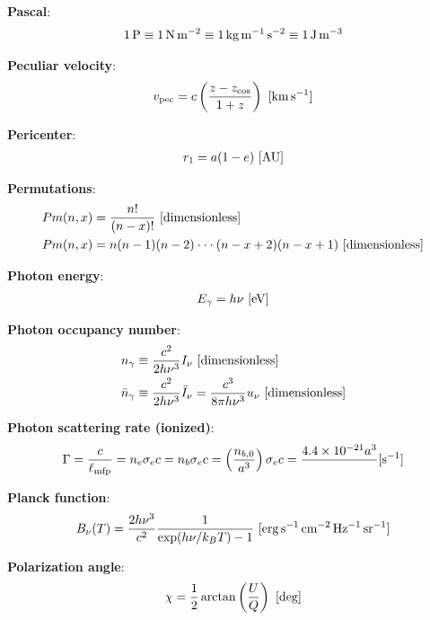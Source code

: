 \documentclass[a4paper,10pt]{article}
\begin{document}
{\noindent}\textbf{Pascal}:
\begin{align*}
    {\rm 1\,P \equiv 1\,N\,m^{-2} \equiv 1\,kg\,m^{-1}\,s^{-2} \equiv 1\,J\,m^{-3}}
\end{align*}

{\noindent}\textbf{Peculiar velocity}:
\begin{align*}
    v_{\rm pec} = c\left(\frac{z-z_\mathrm{cos}}{1+z}\right) ~ [{\rm km\,s^{-1}}]
\end{align*}

{\noindent}\textbf{Pericenter}:
\begin{align*}
    r_1 = a(1-e) ~ [{\rm AU}]
\end{align*}

{\noindent}\textbf{Permutations}:
\begin{align*}
    Pm(n,x) &= \frac{n!}{(n-x)!} ~ [{\rm dimensionless}] \\
    Pm(n,x) &= n(n-1)(n-2) \cdot\cdot\cdot (n-x+2)(n-x+1) ~ [{\rm dimensionless}]
\end{align*}

{\noindent}\textbf{Photon energy}:
\begin{align*}
    E_\gamma = h\nu ~ [{\rm eV}]
\end{align*}

{\noindent}\textbf{Photon occupancy number}:
\begin{align*}
    n_\gamma &\equiv \frac{c^2}{2h\nu^3} I_\nu ~ [{\rm dimensionless}] \\
    \bar{n}_\gamma &\equiv \frac{c^2}{2h\nu^3} \bar{I}_\nu = \frac{c^3}{8\pi h\nu^3} u_\nu ~ [{\rm dimensionless}]
\end{align*}

{\noindent}\textbf{Photon scattering rate (ionized)}:
\begin{align*}
    \Gamma = \dfrac{c}{\ell_\mathrm{mfp}} = n_e\sigma_ec = n_b\sigma_ec = \left(\dfrac{n_{b,0}}{a^3}\right)\sigma_ec = \dfrac{4.4\times10^{-21}{a^3}} ~ [{\rm s^{-1}}]
\end{align*}

{\noindent}\textbf{Planck function}:
\begin{align*}
    B_\nu(T) = \frac{2h\nu^3 }{c^2} \frac{1}{\exp(h\nu/k_BT) - 1} ~ [{\rm erg\,s^{-1}\,cm^{-2}\,Hz^{-1}\,sr^{-1}}]
\end{align*}

{\noindent}\textbf{Polarization angle}:
\begin{align*}
    \chi = \frac{1}{2}\arctan\left(\frac{U}{Q}\right) ~ [{\rm deg}]
\end{align*}
\end{document}
